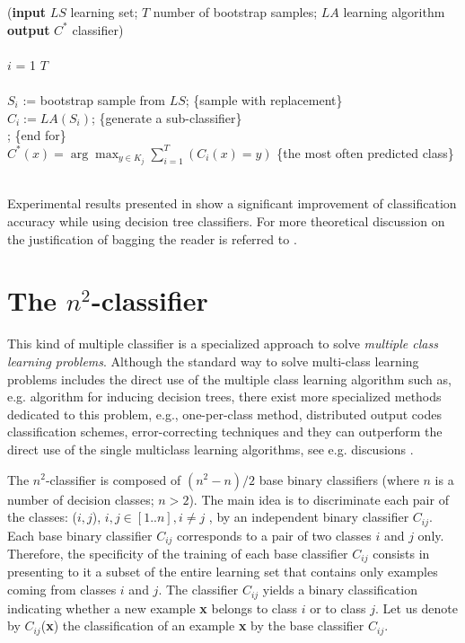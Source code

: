 \documentclass{llncs}
\begin{document}
\begin{algo}
\< \< (\textbf{input}   $LS$ learning set; $T$ number of bootstrap samples;
$LA$ learning algorithm \\ \< \< \textbf{output} $C^*$ classifier) \\
\< \<
\B \\ \< \FOR $i$ = 1 \TO $T$ \DO\\ \<  \B
\\
  $S_i$ := bootstrap sample from $LS$; \{sample with replacement\} \\
  $C_i := LA(S_i)$; \{generate a sub-classifier\} \\
\< \E; \{end for\}\\ \< $C^*(x) = \arg \max_{y \in K_j} \sum
_{i=1}^{T}(C_i(x)=y)$ \{the most often predicted class\}\\ \< \< \E \\
\end{algo}

Experimental results presented in \cite{Bre,BK99,Quin98} show a significant
improvement of classification accuracy while using decision tree
classifiers. For more theoretical discussion on the justification of bagging
the reader is referred to \cite{Bre}.


\section{The $n^2$-classifier}

This kind of multiple classifier is a specialized approach to solve {\em
multiple class learning problems}. Although the standard way to solve
multi-class learning problems includes the direct use of the multiple class
learning algorithm such as, e.g. algorithm for inducing decision trees,
there exist more specialized methods dedicated to this problem, e.g.,
one-per-class method, distributed output codes classification schemes,
error-correcting techniques and they can outperform the direct use of the
single multiclass learning algorithms, see e.g. discusions
\cite{JelStef98,Stef01}.

The $n^2$-classifier is composed of $(n^2-n)/2$ base binary classifiers
(where $n$ is a number of decision classes; $n>2$). The main idea is to
discriminate each pair of the classes: ($i,j $), $i,j \in [ 1..n ], i \neq
j$ , by an independent binary classifier $ C_{ij}$. Each base binary
classifier $C_{ij}$ corresponds to a pair of two classes $i$ and $j$ only.
Therefore, the specificity of the training of each base classifier $C_{ij}$
consists in presenting to it a subset of the entire learning set that
contains only examples coming from classes $i$ and $j$. The classifier
$C_{ij}$ yields a binary classification indicating whether a new example
{\bf x} belongs to class $i$ or to class $j$. Let us denote by $
C_{ij}$({\bf x}) the classification of an example {\bf x} by the base
classifier $C_{ij}$.
\end{document}

